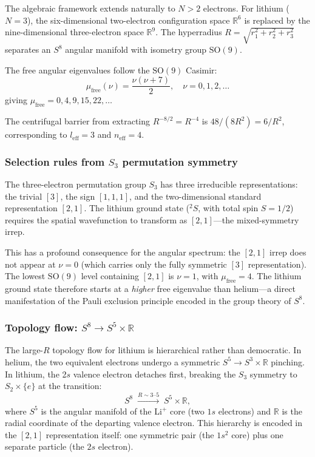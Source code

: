 \documentclass[aps,pra,twocolumn,superscriptaddress,longbibliography]{revtex4-2}
\begin{document}
The algebraic framework extends naturally to $N > 2$ electrons.
For lithium ($N = 3$), the six-dimensional two-electron
configuration space $\mathbb{R}^6$ is replaced by the
nine-dimensional three-electron space $\mathbb{R}^9$.  The
hyperradius $R = \sqrt{r_1^2 + r_2^2 + r_3^2}$ separates an
$S^8$ angular manifold with isometry group $\mathrm{SO}(9)$.

The free angular eigenvalues follow the $\mathrm{SO}(9)$ Casimir:
\begin{equation}
  \mu_{\mathrm{free}}(\nu) = \frac{\nu(\nu + 7)}{2},
  \quad \nu = 0, 1, 2, \ldots
  \label{eq:casimir_li}
\end{equation}
giving $\mu_{\mathrm{free}} = 0, 4, 9, 15, 22, \ldots$

The centrifugal barrier from extracting $R^{-8/2} = R^{-4}$
is $48/(8R^2) = 6/R^2$, corresponding to $l_{\mathrm{eff}} = 3$
and $n_{\mathrm{eff}} = 4$.

\subsubsection{Selection rules from $S_3$ permutation symmetry}

The three-electron permutation group $S_3$ has three irreducible
representations: the trivial $[3]$, the sign $[1,1,1]$, and
the two-dimensional standard representation $[2,1]$.  The
lithium ground state (${}^2S$, with total spin $S = 1/2$) requires
the spatial wavefunction to transform as $[2,1]$---the
mixed-symmetry irrep.

This has a profound consequence for the angular spectrum: the
$[2,1]$ irrep does not appear at $\nu = 0$ (which carries only
the fully symmetric $[3]$ representation).  The lowest
$\mathrm{SO}(9)$ level containing $[2,1]$ is $\nu = 1$, with
$\mu_{\mathrm{free}} = 4$.  The lithium ground state therefore
starts at a \emph{higher} free eigenvalue than helium---a direct
manifestation of the Pauli exclusion principle encoded in the
group theory of $S^8$.

\subsubsection{Topology flow: $S^8 \to S^5 \times \mathbb{R}$}

The large-$R$ topology flow for lithium is hierarchical rather
than democratic.  In helium, the two equivalent electrons undergo
a symmetric $S^5 \to S^3 \times \mathbb{R}$ pinching.  In
lithium, the 2$s$ valence electron detaches first, breaking the
$S_3$ symmetry to $S_2 \times \{e\}$ at the transition:
\begin{equation}
  S^8 \;\xrightarrow{R \sim 3\text{--}5}\; S^5 \times \mathbb{R},
\end{equation}
where $S^5$ is the angular manifold of the Li$^+$ core (two $1s$
electrons) and $\mathbb{R}$ is the radial coordinate of the
departing valence electron.  This hierarchy is encoded in the
$[2,1]$ representation itself: one symmetric pair (the $1s^2$
core) plus one separate particle (the $2s$ electron).
\end{document}
